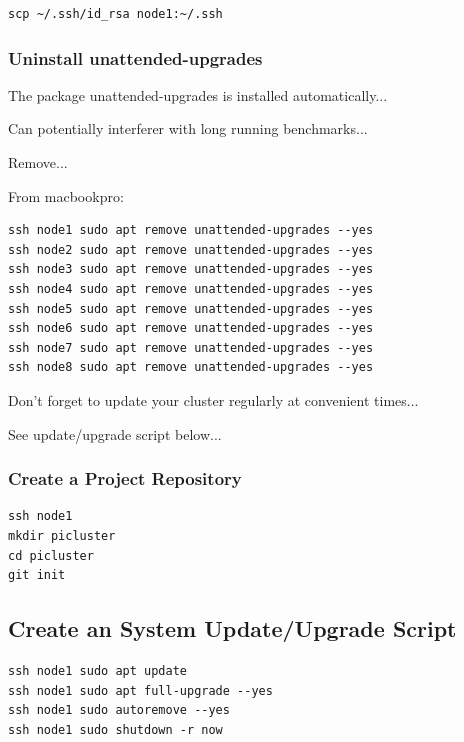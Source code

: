 \documentclass{article}
\begin{document}
\lstset{frameround=tttt}
\begin{lstlisting}[frame=single]
scp ~/.ssh/id_rsa node1:~/.ssh
\end{lstlisting}


\subsubsection{Uninstall unattended-upgrades}

The package unattended-upgrades is installed automatically...

Can potentially interferer with long running benchmarks...

Remove...

From macbookpro:

\lstset{frameround=tttt}
\begin{lstlisting}[frame=single]
ssh node1 sudo apt remove unattended-upgrades --yes
ssh node2 sudo apt remove unattended-upgrades --yes
ssh node3 sudo apt remove unattended-upgrades --yes
ssh node4 sudo apt remove unattended-upgrades --yes
ssh node5 sudo apt remove unattended-upgrades --yes
ssh node6 sudo apt remove unattended-upgrades --yes
ssh node7 sudo apt remove unattended-upgrades --yes
ssh node8 sudo apt remove unattended-upgrades --yes
\end{lstlisting}

Don't forget to update your cluster regularly at convenient times...

See update/upgrade script below...


\subsubsection{Create a Project Repository}

\lstset{frameround=tttt}
\begin{lstlisting}[frame=single]
ssh node1
mkdir picluster
cd picluster
git init
\end{lstlisting}


\subsection{Create an System Update/Upgrade Script}

\lstset{frameround=tttt}
\begin{lstlisting}[frame=single]
ssh node1 sudo apt update
ssh node1 sudo apt full-upgrade --yes
ssh node1 sudo autoremove --yes
ssh node1 sudo shutdown -r now
\end{lstlisting}
\end{document}
